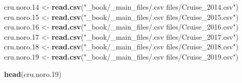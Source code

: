 \documentclass[
  11,
]{book}
\newenvironment{Shaded}{\begin{snugshade}}{\end{snugshade}}
\newcommand{\FloatTok}[1]{\textcolor[rgb]{0.06,0.06,0.06}{#1}}
\newcommand{\FunctionTok}[1]{\textcolor[rgb]{0.27,0.27,0.27}{\textbf{#1}}}
\newcommand{\NormalTok}[1]{#1}
\newcommand{\OtherTok}[1]{\textcolor[rgb]{0.37,0.37,0.37}{#1}}
\newcommand{\StringTok}[1]{\textcolor[rgb]{0.5,0.5,0.5}{#1}}
\begin{document}
\begin{Shaded}
\begin{Highlighting}[]
\NormalTok{cru.noro}\FloatTok{.14} \OtherTok{\textless{}{-}} \FunctionTok{read.csv}\NormalTok{(}\StringTok{"\_book/\_main\_files/.csv files/Cruise\_2014.csv"}\NormalTok{)}
\NormalTok{cru.noro}\FloatTok{.15} \OtherTok{\textless{}{-}} \FunctionTok{read.csv}\NormalTok{(}\StringTok{"\_book/\_main\_files/.csv files/Cruise\_2015.csv"}\NormalTok{)}
\NormalTok{cru.noro}\FloatTok{.16} \OtherTok{\textless{}{-}} \FunctionTok{read.csv}\NormalTok{(}\StringTok{"\_book/\_main\_files/.csv files/Cruise\_2016.csv"}\NormalTok{)}
\NormalTok{cru.noro}\FloatTok{.17} \OtherTok{\textless{}{-}} \FunctionTok{read.csv}\NormalTok{(}\StringTok{"\_book/\_main\_files/.csv files/Cruise\_2017.csv"}\NormalTok{)}
\NormalTok{cru.noro}\FloatTok{.18} \OtherTok{\textless{}{-}} \FunctionTok{read.csv}\NormalTok{(}\StringTok{"\_book/\_main\_files/.csv files/Cruise\_2018.csv"}\NormalTok{)}
\NormalTok{cru.noro}\FloatTok{.19} \OtherTok{\textless{}{-}} \FunctionTok{read.csv}\NormalTok{(}\StringTok{"\_book/\_main\_files/.csv files/Cruise\_2019.csv"}\NormalTok{)}
\end{Highlighting}
\end{Shaded}

\begin{Shaded}
\begin{Highlighting}[]
\FunctionTok{head}\NormalTok{(cru.noro}\FloatTok{.19}\NormalTok{)}
\end{Highlighting}
\end{Shaded}
\end{document}
